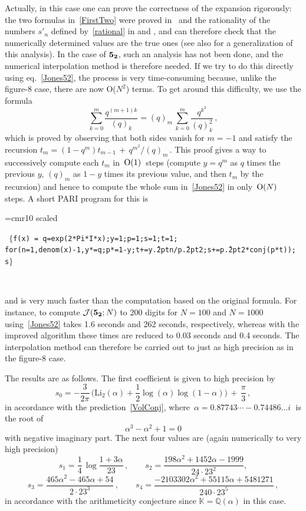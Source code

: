\documentclass[hyper]{JHEP3}
\def\CJ {{\cal J}}
\newcommand\be{\begin{equation}}
\newcommand\ee{\end{equation}}
\newcommand\bes{\begin{equation*}}
\newcommand\ees{\end{equation*}}
\def\a{\alpha}
\begin{document}
Actually, in this case one can prove the correctness of the expansion rigorously: the two
formulas in~\eqref{FirstTwo} were proved in~\cite{andersen-hansen} and the rationality
of the numbers $s'_n$ defined by~\eqref{rational} in \cite{garoufalidis-costin, garoufalidis-geronimo}
and \cite{zagHans}, and can therefore check that the numerically determined
values are the true ones (see also \cite{zagMod} for a generalization of this analysis).
In the case of ${\bf 5_2}$, such an analysis has not been done,
and the numerical interpolation method is therefore needed.  If we try to do this directly
using eq.~\eqref{Jones52}, the process is very time-consuming because, unlike the figure-8
case, there are now O($N^2$) terms.  To get around this difficulty, we use the formula
\be\label{idA}
\sum_{k=0}^m\frac{q^{(m+1)k}}{(q)_k}=(q)_m\,\sum_{k=0}^m\frac{q^{k^2}}{(q)_k^2}\,,\ee
which is proved by observing that both sides vanish for $m=-1$ and satisfy the recursion
$t_m=(1-q^m)t_{m-1}\,+\,q^{m^2}/(q)_m\,$. This proof gives a way to successively compute
each $t_m$ in $\,\text O(1)\,$ steps (compute $y=q^m$ as $q$ times the previous $y$, $(q)_m$
as $1-y$ times its previous value, and then $t_m$ by the recursion) and hence to
compute the whole sum in~\eqref{Jones52} in only $\,\text O(N)\,$ steps.
A short PARI program for this is

\bigskip
{\obeylines\font\small=cmr10 scaled \magstephalf\parindent=0pt\raggedright\tt
\hskip0pt \qquad $\{$f(x) = q=exp(2*Pi*I*x);y=1;p=1;s=1;t=1;\;
\hskip0pt  $\qquad$ for(n=1,denom(x)-1,y*=q;p*=1-y;t+=y\^{\kern.2pt}n/p\^{\kern.2pt}2;s+=p\^{\kern.2pt}2*conj(p*t)); s$\}$  \par\ \leftskip=0pt }

\noindent
and is very much faster than the computation based on the original formula.  For instance, to compute
$\CJ({\bf 5_2};N)$ to 200 digits for $N=100$ and $N=1000$ using~\eqref{Jones52} takes  1.6 seconds and
262 seconds, respectively, whereas with the improved algorithm these times are reduced to 0.03 seconds
and 0.4 seconds. The interpolation method can therefore be carried out
to just as high precision as in the figure-8 case.

The results are as follows.  The first coefficient is given to high precision by
\be s_0=-\frac3{2\pi}\,\bigl(\text{Li}_2(\a)+\frac12\log(\a)\log(1-\a)\bigr)\,+\,\frac{\pi}3\,,\ee
in accordance with the prediction~\eqref{VolConj}, where $\,\a=0.87743\cdots - 0.74486\dots i\;$
is the root of
\be \a^3-\a^2+1=0 \ee
with negative imaginary part.  The next four values are (again numerically to very high precision)
\bes s_1=\frac14\,\log\frac{1+3\a}{23}\,,\qquad s_2=\frac{198\a^2+1452\a-1999}{24\cdot23^2}, \ees
\bes s_3=\frac{465\a^2-465\a+54}{2\cdot23^3}\,,\qquad s_4=\frac{-2103302\a^2+55115\a+5481271}{240\cdot23^5}\,, \ees
in accordance with the arithmeticity conjecture since $\mathbb K=\mathbb Q(\a)$ in this case.
\end{document}
